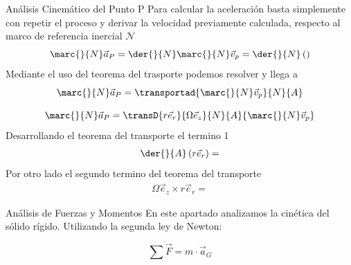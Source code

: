 \begin{sol}
\begin{cinematicaUnificada}{Análisis Cinemático del Punto P}
        Para calcular la aceleración basta simplemente con repetir el proceso y derivar la velocidad previamente calculada, respecto al marco de referencia inercial $\mathcal{N}$
        \begin{equation}
            \marc{}{N}\vec{a}_P=\der{}{N}\marc{}{N}\vec{v}_p=\der{}{N}\left(\right)
        \end{equation}
        Mediante el uso del teorema del trasporte podemos resolver y llega a 
        \begin{equation}
            \marc{}{N}\vec{a}_P=\transportad{\marc{}{N}\vec{v}_p}{N}{A}
        \end{equation}
        
        
        
        \begin{equation}
            \marc{}{N}\vec{a}_P=\transD{r\vec{e}_r}{\Omega\vec{e}_z}{N}{A}{\marc{}{N}\vec{v}_p}
        \end{equation}
        Desarrollando el teorema del transporte el termino 1
        \begin{align}
            \der{}{A}\left(r\vec{e}_r\right)=
        \end{align}
        Por otro lado el segundo termino del teorema del transporte
        \begin{align}
            \Omega\vec{e}_z\times r\vec{e}_r=
        \end{align}

    \end{cinematicaUnificada}
    \begin{cinetica}{Análisis de Fuerzas y Momentos}
        En este apartado analizamos la cinética del sólido rígido. 
        Utilizando la segunda ley de Newton:
        
        \begin{equation}
            \sum \vec{F} = m \cdot \vec{a}_G
        \end{equation}
        
\begin{center}
\end{center}
\end{cinetica}
\end{sol}
